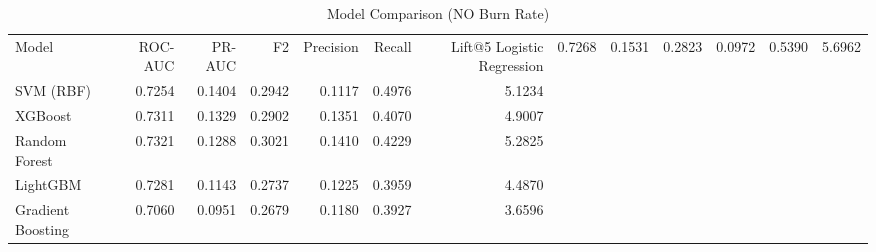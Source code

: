 \begin{table}
\caption{Model Comparison (NO Burn Rate)}
\label{tab:models_noburn}
\begin{tabular}{lrrrrrr}
\toprule
Model & ROC-AUC & PR-AUC & F2 & Precision & Recall & Lift@5%
\midrule
Logistic Regression & 0.7268 & 0.1531 & 0.2823 & 0.0972 & 0.5390 & 5.6962 \\
SVM (RBF) & 0.7254 & 0.1404 & 0.2942 & 0.1117 & 0.4976 & 5.1234 \\
XGBoost & 0.7311 & 0.1329 & 0.2902 & 0.1351 & 0.4070 & 4.9007 \\
Random Forest & 0.7321 & 0.1288 & 0.3021 & 0.1410 & 0.4229 & 5.2825 \\
LightGBM & 0.7281 & 0.1143 & 0.2737 & 0.1225 & 0.3959 & 4.4870 \\
Gradient Boosting & 0.7060 & 0.0951 & 0.2679 & 0.1180 & 0.3927 & 3.6596 \\
\bottomrule
\end{tabular}
\end{table}
